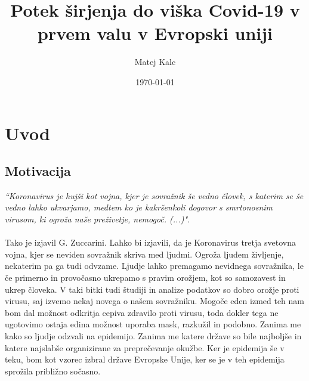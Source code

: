 \documentclass[a4paper,11pt]{article}
\title{Potek širjenja do viška Covid-19 v prvem valu v Evropski uniji}
\author{Matej Kalc} %
\date{\today}
\begin{document}
\maketitle

\section{Uvod}
\subsection{Motivacija}


\emph{“Koronavirus je hujši kot vojna, kjer je sovražnik še vedno človek, s katerim se še
vedno lahko ukvarjamo, medtem ko je kakršenkoli dogovor s smrtonosnim virusom,
ki ogroža naše preživetje, nemogoč. (...)".} \cite{zucc}\\ \\
Tako je izjavil G. Zuccarini. Lahko bi izjavili, da je Koronavirus tretja svetovna vojna, kjer se neviden sovražnik skriva med ljudmi. Ogroža ljudem življenje, nekaterim pa ga tudi odvzame. Ljudje lahko premagamo nevidnega sovražnika, le če primerno in provočasno ukrepamo s pravim orožjem, kot so samozavest in ukrep človeka. V taki bitki tudi študiji in analize podatkov so dobro orožje proti virusu, saj izvemo nekaj novega o našem sovražniku. Mogoče eden izmed teh nam bom dal možnost odkritja cepiva zdravilo proti virusu, toda dokler tega ne ugotovimo ostaja edina možnost uporaba mask, razkužil in podobno. Zanima me kako so ljudje odzvali na epidemijo. Zanima me katere države so bile najboljše in katere najslabše organizirane za preprečevanje okužbe. Ker je epidemija še v teku, bom kot vzorec izbral države Evropske Unije, ker se je v teh epidemija sprožila približno sočasno. 
\end{document}
